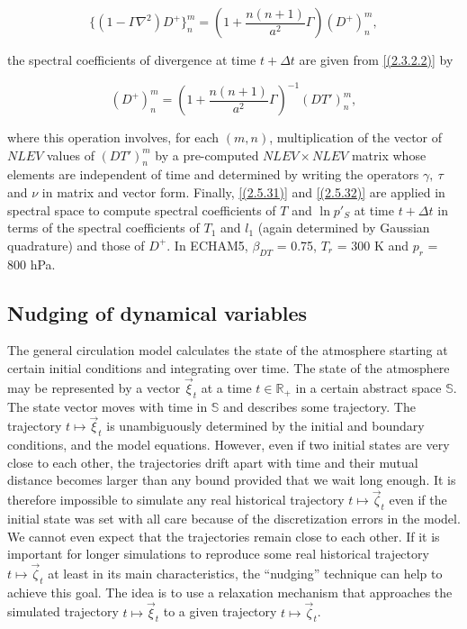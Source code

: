 \begin{equation}
\{(1 - \Gamma \nabla^2) D^+ \}^m_n = \left(1+ 
\frac{n(n+1)}{a^2} \Gamma\right)(D^+)^m_n , 
\label{(2.5.43)}
\end{equation}

the spectral coefficients of divergence at time $t + \Delta t$ are
given from \ref{(2.3.2.2)} by

\begin{equation}
(D^+)^m_n =  \left(1+ \frac{n(n+1)}{a^2} \Gamma\right)^{-1}(DT')^m_n ,
\label{(2.5.44)}
\end{equation}

where this operation involves, for each $(m,n)$, multiplication of the
vector of $NLEV$ values of $(DT')^m_n$ by a pre-computed $NLEV\times
NLEV$ matrix whose elements are independent of time and determined by
writing the operators $\gamma , \ \tau$ and $\nu$ in matrix and vector
form. Finally, \ref{(2.5.31)} and \ref{(2.5.32)} are applied in
spectral space to compute spectral coefficients of $T$ and $\ln p'_S$
at time $t + \Delta t$ in terms of the spectral coefficients of $T_1$
and $l_1$ (again determined by Gaussian quadrature) and those of
$D^+$. In ECHAM5, $\beta_{DT}$ = 0.75, $T_r$ = 300 K and $p_r$ = 800 hPa.

\subsection{Nudging of dynamical variables}

The general circulation model \echam{} calculates the state of the
atmosphere starting at certain initial conditions and integrating over
time. The state of the atmosphere may be represented by a vector
$\vec{\xi}_t$ at a time $t\in\mathbb{R}_+$ in a 
certain abstract space $\mathbb{S}$. The state vector moves with time
in $\mathbb{S}$ and describes some trajectory. 
The trajectory $t\mapsto\vec{\xi}_t$ is unambiguously determined by the
initial and boundary conditions, and the model equations. However, even if two
initial states are very close to each other, the trajectories drift
apart with time and their mutual distance becomes larger than any
bound provided that we wait long enough. It is therefore impossible to
simulate any real historical trajectory $t\mapsto\vec{\zeta}_t$ even if the
initial state was 
set with all care because of the discretization errors in the
model. We cannot even expect that the trajectories remain close to
each other.   
If it is important for longer simulations to reproduce some
real historical trajectory $t\mapsto\vec{\zeta}_t$ at least in its
main characteristics, the 
``nudging'' technique can help to achieve this goal.
The idea is to use a relaxation mechanism that approaches the
simulated trajectory $t\mapsto\vec{\xi}_t$ to a given trajectory
$t\mapsto\vec{\zeta}_t$. 

